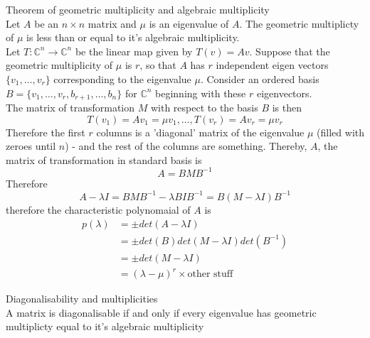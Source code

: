 \documentclass[journal, letterpaper]{IEEEtran}
\begin{document}
    \begin{mybox}{Theorem of geometric multiplicity and algebraic multiplicity} \\ 
        Let $A$ be an $n \times n$ matrix and $\mu$ is an eigenvalue of $A$. The geometric multiplicty of $\mu$
        is less than or equal to it's algebraic multiplicity.
        \newline \\ 
        Let $T : \mathbb{C}^n \to \mathbb{C}^n$ be the linear map given by $T(v) = Av$. Suppose that the geometric multiplicity of $\mu$ is $r$, so that $A$ has $r$ independent eigen vectors $\{v_1, \dots, v_r \}$ corresponding to the eigenvalue $\mu$. Consider an ordered basis $B = \{v_1, \dots, v_r, b_{r+1}, \dots, b_n\}$ for $\mathbb{C}^n$ beginning with these $r$ eigenvectors.
        \newline \\ 
        The matrix of transformation $M$ with respect to the basis $B$ is then
        $$ T(v_1) = Av_1 = \mu v_1, \dots, T(v_r) = Av_r = \mu v_r $$
        Therefore the first $r$ columns is a 'diagonal' matrix of the eigenvalue $\mu$ (filled with zeroes until $n$) - and the rest of the columns are something. Thereby, $A$, the matrix of transformation in standard basis is
        $$ A = BMB^{-1}$$
        Therefore
        $$ A - \lambda I = BMB^{-1} - \lambda BIB^{-1} = B(M - \lambda I)B^{-1}$$
        therefore the characteristic polynomaial of $A$ is
        \begin{align*}
            p(\lambda) &= \pm det(A - \lambda I) \\
                       &= \pm det(B)det(M -\lambda I)det(B^{-1})  \\
                       &= \pm det(M - \lambda I) \\
                       &=  (\lambda - \mu)^r \times \text{other stuff}
        \end{align*}
    \end{mybox}
    \begin{myboxr}{Diagonalisability and multiplicities} \\ 
        A matrix is diagonalisable if and only if every eigenvalue has geometric multiplicty equal to it's algebraic multiplicity
    \end{myboxr}
\end{document}
